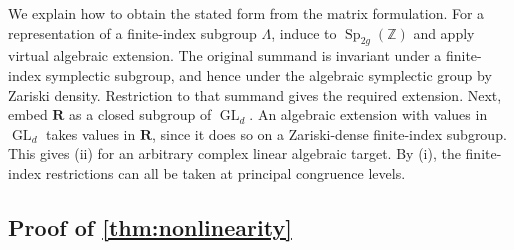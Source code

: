 \documentclass[11pt,a4paper]{article}
\theoremstyle{definition}
\newcommand{\Z}{\mathbb Z}
\newcommand{\Sp}{\operatorname{Sp}}
\newcommand{\GL}{\operatorname{GL}}
\begin{document}
We explain how to obtain the stated form from the matrix formulation.
For a representation of a finite-index subgroup \(\Lambda\), induce
to \(\Sp_{2g}(\Z)\) and apply virtual algebraic extension. The
original summand is invariant under a finite-index symplectic subgroup,
and hence under the algebraic symplectic group by Zariski density.
Restriction to that summand gives the required extension. Next, embed
\(\mathbf R\) as a closed subgroup of \(\GL_d\). An algebraic
extension with values in \(\GL_d\) takes values in \(\mathbf R\),
since it does so on a Zariski-dense finite-index subgroup. This gives
(ii) for an arbitrary complex linear algebraic target. By (i), the
finite-index restrictions can all be taken at principal congruence
levels.

\subsection{Proof of \texorpdfstring{\cref{thm:nonlinearity}}{Theorem D}}
\end{document}

